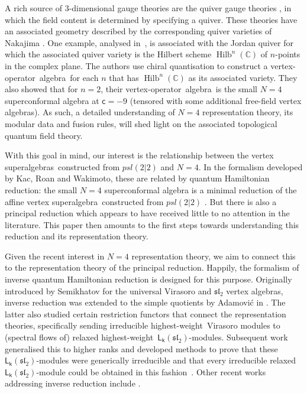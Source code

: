 \documentclass[10pt,a4paper]{amsart}
\numberwithin{equation}{section}
\newcommand{\cc}{\mathsf{c}} %
\newcommand{\kk}{\mathsf{k}} %
\newcommand{\fld}[1]{\mathbb{#1}} %
\newcommand{\alg}[1]{\mathfrak{#1}} %
\newcommand{\VOA}[1]{\mathsf{#1}} %
\newcommand{\CC}{\fld{C}}
\newcommand{\SLA}[2]{\alg{#1}_{#2}} %
\newcommand{\SLSA}[3]{\alg{#1}_{#2 \vert #3}} %
\newcommand{\sltwo}{\SLA{sl}{2}}
\newcommand{\psl}{\SLSA{psl}{2}{2}}
\newcommand{\saff}[2]{\VOA{L}_{#1}(#2)} %
\newcommand{\ssl}[1][\kk]{\saff{#1}{\sltwo}} %
\newcommand{\hw}{highest-weight}
\newcommand{\rhw}{relaxed highest-weight}
\newcommand{\vo}{vertex-operator}
\newcommand{\voa}{\vo\ algebra}
\newcommand{\sva}{vertex superalgebra}
\newcommand{\svas}{\sva s}
\newcommand{\qhr}{quantum Hamiltonian reduction} %
\def\smash#1{#1}
\def\psl{psl(2|2)}
\def\qhr{quantum Hamiltonian reduction}
\begin{document}
A rich source of $3$-dimensional gauge theories are the quiver gauge theories \cite{DouDbr96}, in which the field content is determined by specifying a quiver.
These theories have an associated geometry described by the corresponding quiver varieties of Nakajima \cite{NakIns94,NakQui98}.
One example, analysed in~\cite{AraHil23}, is associated with the Jordan quiver for which the associated quiver variety is the Hilbert scheme $\operatorname{Hilb}^{n}(\CC)$ of $n$-points in the complex plane.
The authors use chiral quantisation to construct a \voa\ for each $n$ that has $\operatorname{Hilb}^{n}(\CC)$ as its associated variety.
They also showed that for $n=2$, their \voa\ is the small $N=4$ superconformal algebra at $\cc = -9$ (tensored with some additional free-field vertex algebras).
As such, a detailed understanding of $N=4$ representation theory, its modular data and fusion rules, will shed light on the associated topological quantum field theory.

With this goal in mind, our interest is the relationship between the \svas\ constructed from \smash{$\psl$} and $N=4$.
In the formalism developed by Kac, Roan and Wakimoto, these are related by \qhr: the small $N=4$ superconformal algebra is a minimal reduction of the affine \sva\ constructed from \smash{$\psl$} \cite{KacQua03,KacQua03b}.
But there is also a principal reduction which appears to have received little to no attention in the literature.
This paper then amounts to the first steps towards understanding this reduction and its representation theory.

Given the recent interest in $N=4$ representation theory, we aim to connect this to the representation theory of the principal reduction.
Happily, the formalism of inverse quantum Hamiltonian reduction is designed for this purpose.
Originally introduced by Semikhatov \cite{SemInv94} for the universal Virasoro and $\sltwo$ vertex algebras, inverse reduction was extended to the simple quotients by Adamovi\'{c} in \cite{AdaRea17}.
The latter also studied certain restriction functors that connect the representation theories, specifically sending irreducible \hw\ Virasoro modules to (spectral flows of) \rhw\ $\ssl$-modules.
Subsequent work generalised this to higher ranks and developed methods to prove that these $\ssl$-modules were generically irreducible \cite{AdaRea20} and that every irreducible relaxed $\ssl$-module could be obtained in this fashion~\cite{AdaWei23}.
Other recent works addressing inverse reduction include \cite{AdaNap24,AdaRel21,CreSL225,FasCon24,FasVir24,FasMod24,FehSub21,FehInv23,FehMod21}.
\end{document}
